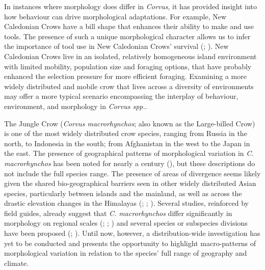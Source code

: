 \documentclass[10pt,a4paper]{article}
\begin{document}
In instances where morphology does differ in \emph{Corvus}, it has provided insight into how behaviour can drive morphological adaptations.
For example, New Caledonian Crows have a bill shape that enhances their ability to make and use tools.
The presence of such a unique morphological character allows us to infer the importance of tool use in New Caledonian Crows' survival (; ).
New Caledonian Crows live in an isolated, relatively homogeneous island environment with limited mobility, population size and foraging options, that have probably enhanced the selection pressure for more efficient foraging.
Examining a more widely distributed and mobile crow that lives across a diversity of environments may offer a more typical scenario encompassing the interplay of behaviour, environment, and morphology in \emph{Corvus spp.}.

The Jungle Crow (\emph{Corvus macrorhynchos}; also known as the Large-billed Crow) is one of the most widely distributed crow species, ranging from Russia in the north, to Indonesia in the south; from Afghanistan in the west to the Japan in the east.
The presence of geographical patterns of morphological variation in \emph{C. macrorhynchos} has been noted for nearly a century (), but these descriptions do not include the full species range.
The presence of areas of divergence seems likely given the shared bio-geographical barriers seen in other widely distributed Asian species, particularly between islands and the mainland, as well as across the drastic elevation changes in the Himalayas (; ; ).
Several studies, reinforced by field guides, already suggest that \emph{C. macrorhynchos} differ significantly in morphology on regional scales (; ; ) and several species or subspecies divisions have been proposed (; ).
Until now, however, a distribution-wide investigation has yet to be conducted and presents the opportunity to highlight macro-patterns of morphological variation in relation to the species' full range of geography and climate.
\end{document}
